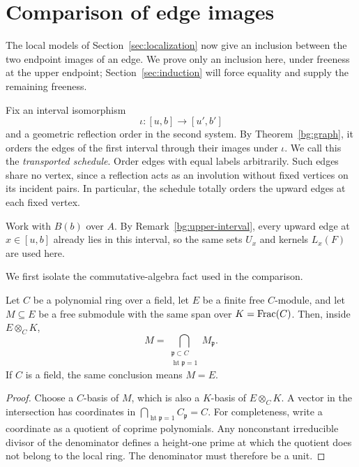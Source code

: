 \section{Comparison of edge images}\label{sec:edge}
The local models of Section~\ref{sec:localization} now give an inclusion
between the two endpoint images of an edge. We prove only an inclusion
here, under freeness at the upper endpoint; Section~\ref{sec:induction}
will force equality and supply the remaining freeness.

Fix an interval isomorphism
\[
 \iota:[u,b]\longrightarrow [u',b']
\]
and a geometric reflection order in the second system.
By Theorem~\ref{bg:graph}, it orders the edges of the first interval
through their images under \(\iota\).
We call this the \emph{transported schedule}.
Order edges with equal labels arbitrarily.
Such edges share no vertex, since a reflection acts as an involution
without fixed vertices on its incident pairs.
In particular, the schedule totally orders the upward edges at each
fixed vertex.

Work with \(B(b)\) over \(A\). By Remark~\ref{bg:upper-interval}, every
upward edge at \(x\in[u,b]\) already lies in this interval, so the same
sets \(U_x\) and kernels \(L_x(F)\) are used here.

We first isolate the commutative-algebra fact used in the comparison.
\begin{lemma}\label{edge:lattice}
Let \(C\) be a polynomial ring over a field, let \(E\) be a finite free
\(C\)-module, and let \(M\subseteq E\) be a free submodule with the same
span over \(K=\operatorname{Frac}(C)\). Then, inside \(E\otimes_C K\),
\[
 M=\bigcap_{\substack{\mathfrak p\subset C\\
                     \operatorname{ht}\mathfrak p=1}}M_{\mathfrak p}.
\]
If \(C\) is a field, the same conclusion means \(M=E\).
\end{lemma}
\begin{proof}
Choose a \(C\)-basis of \(M\), which is also a \(K\)-basis of
\(E\otimes_C K\).
A vector in the intersection has coordinates in
\(\bigcap_{\operatorname{ht}\mathfrak p=1}C_{\mathfrak p}=C\).
For completeness, write a coordinate as a quotient of coprime
polynomials. Any nonconstant irreducible divisor of the denominator
defines a height-one prime at which the quotient does not belong
to the local ring. The denominator must therefore be a unit.
\end{proof}

